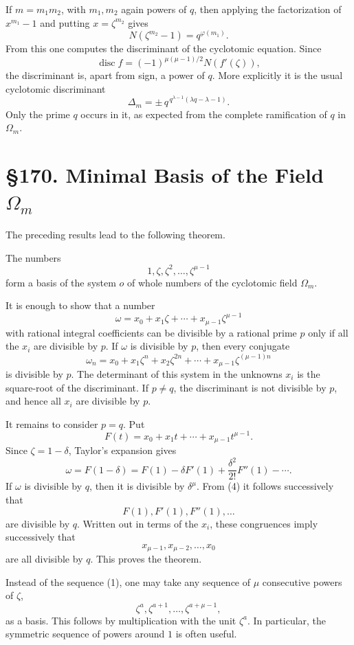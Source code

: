 \documentclass[11pt,a4paper]{book}
\newcommand{\webersection}[2]{\clearpage\section*{\S #1. #2}}
\DeclareMathOperator{\disc}{disc}
\begin{document}
If \(m=m_1m_2\), with \(m_1,m_2\) again powers of \(q\), then applying the factorization of \(x^{m_1}-1\) and putting \(x=\zeta^{m_2}\) gives
\[
  N(\zeta^{m_2}-1)=q^{\varphi(m_1)}.
\tag{8}
\]
From this one computes the discriminant of the cyclotomic equation.  Since
\[
  \disc f=(-1)^{\mu(\mu-1)/2}N(f'(\zeta)),
\]
the discriminant is, apart from sign, a power of \(q\).  More explicitly it is the usual cyclotomic discriminant
\[
  \Delta_m=\pm\,q^{\,q^{\lambda-1}(\lambda q-\lambda-1)}.
\tag{9}
\]
Only the prime \(q\) occurs in it, as expected from the complete ramification of \(q\) in \(\Omega_m\).

\webersection{170}{Minimal Basis of the Field \(\Omega_m\)}

The preceding results lead to the following theorem.

The numbers
\[
  1,\zeta,\zeta^2,\ldots,\zeta^{\mu-1}
\tag{1}
\]
form a basis of the system \(o\) of whole numbers of the cyclotomic field \(\Omega_m\).

It is enough to show that a number
\[
  \omega=x_0+x_1\zeta+\cdots+x_{\mu-1}\zeta^{\mu-1}
\tag{2}
\]
with rational integral coefficients can be divisible by a rational prime \(p\) only if all the \(x_i\) are divisible by \(p\).  If \(\omega\) is divisible by \(p\), then every conjugate
\[
  \omega_n=x_0+x_1\zeta^n+x_2\zeta^{2n}+\cdots+x_{\mu-1}\zeta^{(\mu-1)n}
\tag{3}
\]
is divisible by \(p\).  The determinant of this system in the unknowns \(x_i\) is the square-root of the discriminant.  If \(p\ne q\), the discriminant is not divisible by \(p\), and hence all \(x_i\) are divisible by \(p\).

It remains to consider \(p=q\).  Put
\[
  F(t)=x_0+x_1t+\cdots+x_{\mu-1}t^{\mu-1}.
\]
Since \(\zeta=1-\delta\), Taylor's expansion gives
\[
  \omega=F(1-\delta)
       =F(1)-\delta F'(1)+\frac{\delta^2}{2!}F''(1)-\cdots.
\tag{4}
\]
If \(\omega\) is divisible by \(q\), then it is divisible by \(\delta^\mu\).  From (4) it follows successively that
\[
  F(1),F'(1),F''(1),\ldots
\]
are divisible by \(q\).  Written out in terms of the \(x_i\), these congruences imply successively that
\[
  x_{\mu-1},x_{\mu-2},\ldots,x_0
\]
are all divisible by \(q\).  This proves the theorem.

Instead of the sequence (1), one may take any sequence of \(\mu\) consecutive powers of \(\zeta\),
\[
  \zeta^a,\zeta^{a+1},\ldots,\zeta^{a+\mu-1},
\tag{5}
\]
as a basis.  This follows by multiplication with the unit \(\zeta^a\).  In particular, the symmetric sequence of powers around \(1\) is often useful.
\end{document}
